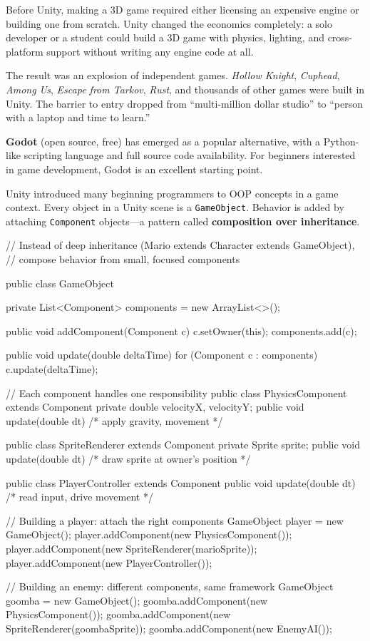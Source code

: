 \documentclass[11pt,letterpaper]{article}
\newcommand{\keyterm}[1]{\textbf{\textcolor{cssecondary}{#1}}}
\begin{document}
\begin{historybox}
Before Unity, making a 3D game required either licensing an expensive engine or building one from scratch. Unity changed the economics completely: a solo developer or a student could build a 3D game with physics, lighting, and cross-platform support without writing any engine code at all.

The result was an explosion of independent games. \textit{Hollow Knight}, \textit{Cuphead}, \textit{Among Us}, \textit{Escape from Tarkov}, \textit{Rust}, and thousands of other games were built in Unity. The barrier to entry dropped from ``multi-million dollar studio'' to ``person with a laptop and time to learn.''

\textbf{Godot} (open source, free) has emerged as a popular alternative, with a Python-like scripting language and full source code availability. For beginners interested in game development, Godot is an excellent starting point.
\end{historybox}

Unity introduced many beginning programmers to OOP concepts in a game context. Every object in a Unity scene is a \texttt{GameObject}. Behavior is added by attaching \texttt{Component} objects---a pattern called \keyterm{composition over inheritance}.

\begin{javacode}
// Instead of deep inheritance (Mario extends Character extends GameObject),
// compose behavior from small, focused components

public class GameObject {
    private List<Component> components = new ArrayList<>();

    public void addComponent(Component c) {
        c.setOwner(this);
        components.add(c);
    }

    public void update(double deltaTime) {
        for (Component c : components) c.update(deltaTime);
    }
}

// Each component handles one responsibility
public class PhysicsComponent extends Component {
    private double velocityX, velocityY;
    public void update(double dt) { /* apply gravity, movement */ }
}

public class SpriteRenderer extends Component {
    private Sprite sprite;
    public void update(double dt) { /* draw sprite at owner's position */ }
}

public class PlayerController extends Component {
    public void update(double dt) { /* read input, drive movement */ }
}

// Building a player: attach the right components
GameObject player = new GameObject();
player.addComponent(new PhysicsComponent());
player.addComponent(new SpriteRenderer(marioSprite));
player.addComponent(new PlayerController());

// Building an enemy: different components, same framework
GameObject goomba = new GameObject();
goomba.addComponent(new PhysicsComponent());
goomba.addComponent(new SpriteRenderer(goombaSprite));
goomba.addComponent(new EnemyAI());
\end{javacode}
\end{document}
